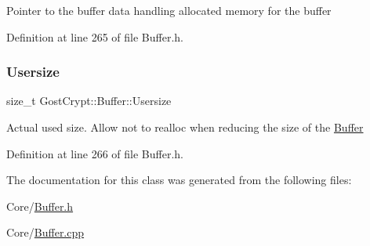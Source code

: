 Pointer to the buffer data handling allocated memory for the buffer 

Definition at line 265 of file Buffer.\+h.

\mbox{\label{class_gost_crypt_1_1_buffer_a91c9eb26330c4d2b58309f43575d9bd2}} 
\subsubsection{\texorpdfstring{Usersize}{Usersize}}
{\footnotesize\ttfamily size\+\_\+t Gost\+Crypt\+::\+Buffer\+::\+Usersize\hspace{0.3cm}{\ttfamily [protected]}}

Actual used size. Allow not to realloc when reducing the size of the \hyperlink{class_gost_crypt_1_1_buffer}{Buffer} 

Definition at line 266 of file Buffer.\+h.



The documentation for this class was generated from the following files\+:\begin{DoxyCompactItemize}
\item 
Core/\hyperlink{_buffer_8h}{Buffer.\+h}\item 
Core/\hyperlink{_buffer_8cpp}{Buffer.\+cpp}\end{DoxyCompactItemize}
